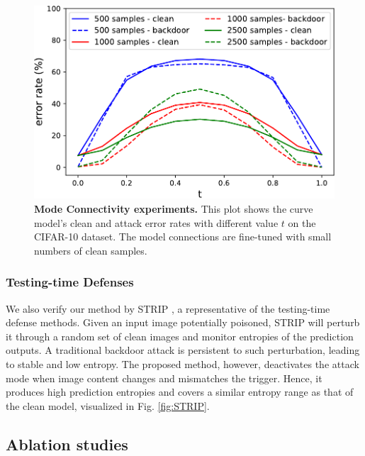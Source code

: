 \documentclass{article}
\begin{document}
\begin{center}
    \begin{figure}[h]
    \begin{center}
     \includegraphics[scale=0.502]{figures/mode_connectivity.pdf}
    \end{center}
    \vspace{-1mm}
    
    \caption{\textbf{Mode Connectivity experiments.} This plot shows the curve model's clean and attack error rates with different value $t$ on the CIFAR-10 dataset. The model connections are fine-tuned with small numbers of clean samples.}
    \label{fig:mode connectivity}
    \end{figure}
    \vspace{-4mm}
\end{center}


\subsubsection{Testing-time Defenses}
We also verify our method by STRIP \cite{gao2019strip}, a representative of the testing-time defense methods. Given an input image potentially poisoned, STRIP will perturb it through a random set of clean images and monitor entropies of the prediction outputs. A traditional backdoor attack is persistent to such perturbation, leading to stable and low entropy. The proposed method, however, deactivates the attack mode when image content changes and mismatches the trigger. Hence, it produces high prediction entropies and covers a similar entropy range as that of the clean model, visualized in Fig. \ref{fig:STRIP}.

\subsection{Ablation studies}
\end{document}
